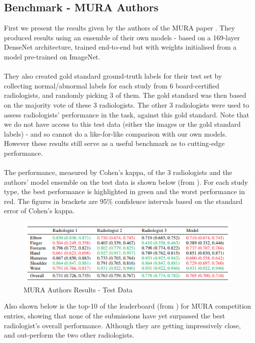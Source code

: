 \documentclass[11pt]{article} %
\theoremstyle{plain}
\theoremstyle{definition}
\begin{document}
\subsection{Benchmark - MURA Authors}
First we present the results given by the authors of the MURA paper \cite{MURA2017}. They produced results using an ensemble of their own models - based on a 169-layer DenseNet architecture, trained end-to-end but with weights initialised from a model pre-trained on ImageNet. 
\\
\\
\noindent
They also created gold standard ground-truth labels for their test set by collecting normal/abnormal labels for each study from 6 board-certified radiologists, and randomly picking 3 of them. The gold standard was then based on the majority vote of these 3 radiologists. The other 3 radiologists were used to assess radiologists' performance in the task, against this gold standard. Note that we do not have access to this test data (either the images or the gold standard labels) - and so cannot do a like-for-like comparison with our own models. However these results still serve as a useful benchmark as to cutting-edge performance.
\\
\\
\noindent
The performance, measured by Cohen's kappa, of the 3 radiologists and the authors' model ensemble on the test data is shown below (from \cite{MURA2017}). For each study type, the best performance is highlighted in green and the worst performance in red. The figures in brackets are 95\% confidence intervals based on the standard error of Cohen's kappa.
\begin{figure}[!ht]
\centering
\includegraphics[scale=0.8]{mura-authors-results.PNG}
\caption{MURA Authors Results - Test Data}
\label{fig:mura-authors-results}
\end{figure}
\FloatBarrier
\newpage
\noindent
Also shown below is the top-10 of the leaderboard (from \cite{MURA_Webpage}) for MURA competition entries, showing that none of the submissions have yet surpassed the best radiologist's overall performance. Although they are getting impressively close, and out-perform the two other radiologists.
\end{document}
